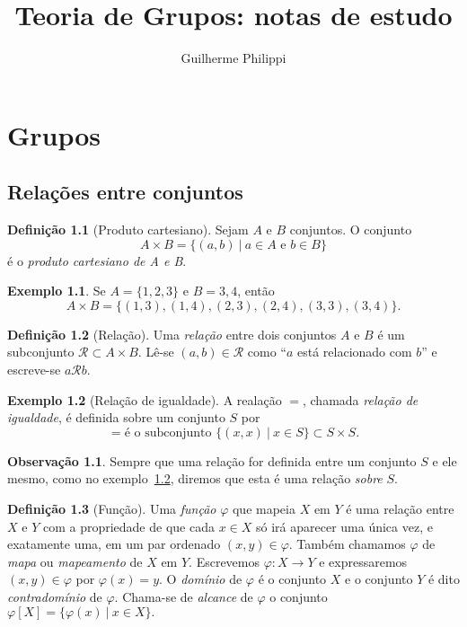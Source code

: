 \documentclass[a4paper,12pt]{report}
\title{Teoria de Grupos: notas de estudo}
\author{Guilherme Philippi}
\theoremstyle{plain}
\theoremstyle{definition}
\newtheorem{definicao}{Definição}[section]
\newtheorem{observacao}{Observação}[section]
\newtheorem{exemplo}{Exemplo}[section]
\begin{document}
\maketitle
\tableofcontents

\chapter{Grupos}

\section{Relações entre conjuntos}

\begin{definicao}[Produto cartesiano]
	Sejam $A$ e $B$ conjuntos. O conjunto $$A\times B = \{(a,b) \ | \ a\in A \text{ e } b\in B\}$$
	é o \emph{produto cartesiano de A e B}.
\end{definicao}

\begin{exemplo}
	Se $A = \{1,2,3\}$ e $B = {3,4}$, então $$A\times B = \{(1,3),(1,4),(2,3),(2,4),(3,3),(3,4)\}.$$
\end{exemplo}

\begin{definicao}[Relação]
	Uma	\emph{relação} entre dois conjuntos $A$ e $B$ é um subconjunto $\mathcal{R}\subset A\times B$. Lê-se $(a,b) \in \mathcal{R}$ como ``$a$ está relacionado com $b$'' e escreve-se $a\mathcal{R}b$.
\end{definicao}

\begin{exemplo}[Relação de igualdade]\label{ex:igualdade}
	A realação $=$, chamada \emph{relação de igualdade}, é definida sobre um conjunto $S$ por $$= \text{é o subconjunto } \{(x,x) \ |\ x\in S\}\subset S\times S.$$
\end{exemplo}

\begin{observacao}
	Sempre que uma relação for definida entre um conjunto $S$ e ele mesmo, como no exemplo~\ref{ex:igualdade}, diremos que esta é uma relação \emph{sobre} $S$.
\end{observacao}

\begin{definicao}[Função]
		Uma \emph{função} $\varphi$ que mapeia $X$ em $Y$ é uma relação entre $X$ e $Y$ com a propriedade de que cada $x\in X$ só irá aparecer uma única vez, e exatamente uma, em um par ordenado $(x,y)\in \varphi$. Também chamamos $\varphi$ de \emph{mapa} ou \emph{mapeamento} de $X$ em $Y$. Escrevemos $\varphi: X\longrightarrow Y$ e expressaremos $(x,y)\in\varphi$ por $\varphi(x) = y$. O \emph{domínio} de $\varphi$ é o conjunto $X$ e o conjunto $Y$ é dito \emph{contradomínio} de $\varphi$. Chama-se de \emph{alcance} de $\varphi$ o conjunto $\varphi[X] = \{\varphi(x)\ | \ x \in X\}.$
\end{definicao}
\end{document}
